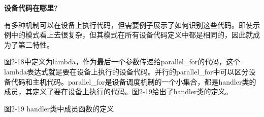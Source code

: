 \hspace*{\fill} \par %
\textbf{设备代码在哪里?}

有多种机制可以在设备上执行代码，但需要例子展示了如何识别这些代码。即使示例中的模式看上去很复杂，但其模式在所有设备代码定义中都是相同的，因此就成为了第二特性。\par

图2-18中定义为lambda，作为最后一个参数传递给parallel\_for的代码，这个lambda表达式就是要在设备上执行的设备代码。并行的parallel\_for中可以区分设备代码和主机代码。parallel\_for是设备调度机制的一个小集合，都是handler类的成员，其定义了要在设备上执行的代码。图2-19给出了handler类的定义。\par

\hspace*{\fill} \par %
图2-19 handler类中成员函数的定义
